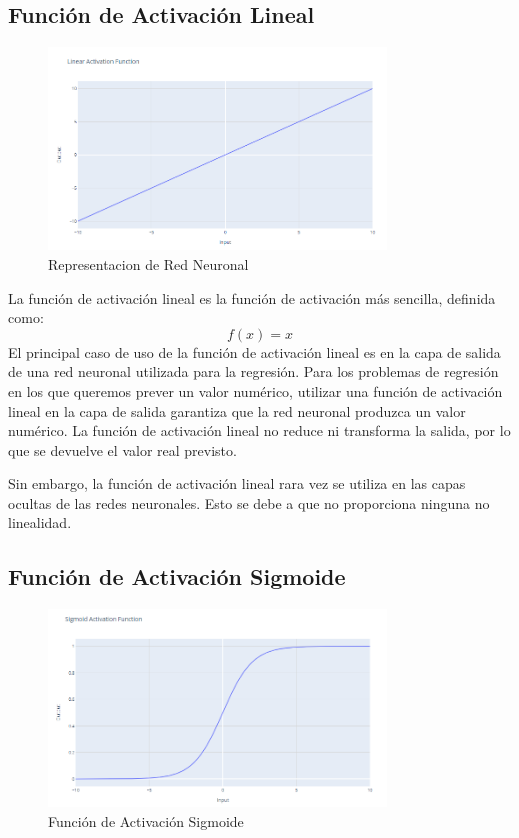 \documentclass[12pt]{article}
\begin{document}
    \subsection*{Función de Activación Lineal}
    \begin{figure}[H]
      \centering
      \includegraphics[width=0.8\textwidth]{./Imagenes/funcionActivacionLineal.png}
      \caption{Representacion de Red Neuronal}
      \label{fig:cuarta}
    \end{figure}
    
    La función de activación lineal es la función de activación más sencilla, definida como:
    \[ f(x) = x \]
    El principal caso de uso de la función de activación lineal es en la capa de salida de una red neuronal 
    utilizada para la regresión. Para los problemas de regresión en los que queremos prever un valor numérico, 
    utilizar una función de activación lineal en la capa de salida garantiza que la red neuronal produzca un 
    valor numérico. La función de activación lineal no reduce ni transforma la salida, por lo que se devuelve 
    el valor real previsto.\par
    Sin embargo, la función de activación lineal rara vez se utiliza en las capas ocultas de las redes neuronales. 
    Esto se debe a que no proporciona ninguna no linealidad.

    \subsection*{Función de Activación Sigmoide}
      \begin{figure}[H]
        \centering
        \includegraphics[width=0.8\textwidth]{./Imagenes/funcionSigmoide.png}
        \caption{Función de Activación Sigmoide}
        \label{fig:quinta}
      \end{figure}
    
\end{document}
